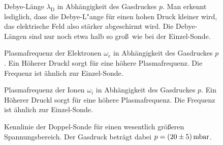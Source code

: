 \begin{figure}[htbp]
    \centering
    
    \caption{
        Debye-L\"ange $\lambda_\text{D}$ in Abh\"angigkeit des Gasdruckes $p$.
        Man erkennt lediglich, dass die Debye-L"ange f\"ur einen hohen Druck kleiner wird, das elektrische Feld also st\"arker abgeschirmt wird.
        Die Debye-L\"angen sind nur noch etwa halb so gro\ss\ wie bei der Einzel-Sonde.
    }
    \label{double_deb}
\end{figure}

\begin{figure}[htbp]
    \centering
    
    \caption{
        Plasmafrequenz der Elektronen $\omega_e$ in Abh\"angigkeit des Gasdruckes $p$.
        Ein H\"oherer Druckl sorgt f\"ur eine h\"ohere Plasmafrequenz.
        Die Frequenz ist \"ahnlich zur Einzel-Sonde.
    }
    \label{double_wpe}
\end{figure}

\begin{figure}[htbp]
    \centering
    
    \caption{
        Plasmafrequenz der Ionen $\omega_i$ in Abh\"angigkeit des Gasdruckes $p$.
        Ein H\"oherer Druckl sorgt f\"ur eine h\"ohere Plasmafrequenz.
        Die Frequenz ist \"ahnlich zur Einzel-Sonde.
    }
    \label{double_wpi}
\end{figure}

\begin{figure}[htbp]
    \centering
    
    \caption{
        Kennlinie der Doppel-Sonde f\"ur einen wesentlich gr\"o\ss eren Spannungsbereich.
        Der Gasdruck betr\"agt dabei $p=\SI{20\pm 5}{\milli\bar}$.
    }
    \label{double_KL_1}
\end{figure}

\FloatBarrier
